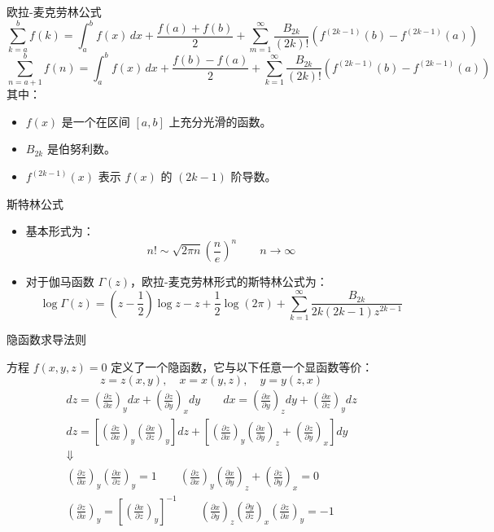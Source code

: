 \begin{defn}
    欧拉-麦克劳林公式
\[
\sum_{k=a}^{b} f(k) = \int_{a}^{b} f(x) \, dx + \frac{f(a) + f(b)}{2} 
+ \sum_{m=1}^{\infty} \frac{B_{2k}}{(2k)!} \left( f^{(2k-1)}(b) - f^{(2k-1)}(a) \right) 
\]
\[
\sum_{n=a+1}^{b} f(n) = \int_{a}^{b} f(x) \, dx + \frac{f(b) - f(a)}{2} 
+ \sum_{k=1}^{\infty} \frac{B_{2k}}{(2k)!} \left( f^{(2k-1)}(b) - f^{(2k-1)}(a) \right)
\]
其中：
\begin{itemize}
    \item \( f(x) \) 是一个在区间 \([a, b]\) 上充分光滑的函数。
    \item \( B_{2k} \) 是伯努利数。
    \item \( f^{(2k-1)}(x) \) 表示 \( f(x) \) 的 \( (2k-1) \) 阶导数。
\end{itemize}
\end{defn}
\begin{defn}
    斯特林公式
\begin{itemize}
    \item 基本形式为：
\[
n! \sim \sqrt{2\pi n} \left( \frac{n}{e} \right)^n \qquad n \to \infty
\]
\item 对于伽马函数 \( \Gamma(z) \)，欧拉-麦克劳林形式的斯特林公式为：
\[
\log \Gamma(z) = \left( z - \frac{1}{2} \right) \log z - z + \frac{1}{2} \log(2\pi) 
+ \sum_{k=1}^{\infty} \frac{B_{2k}}{2k(2k-1)z^{2k-1}}
\]
\end{itemize}
\end{defn}
\begin{defn}
隐函数求导法则

方程 \( f(x, y, z) = 0 \) 定义了一个隐函数，它与以下任意一个显函数等价：
    \[z = z(x, y), \quad x = x(y, z), \quad y = y(z, x)\]
\begin{gather*}
    dz = \left( \frac{\partial z}{\partial x} \right)_y dx + \left( \frac{\partial z}{\partial y} \right)_x dy
    \qquad
    dx = \left( \frac{\partial x}{\partial y} \right)_z dy + \left( \frac{\partial x}{\partial z} \right)_y dz
    \\
    dz = \left[ \left( \frac{\partial z}{\partial x} \right)_y \left( \frac{\partial x}{\partial z} \right)_y \right] dz 
    + \left[ \left( \frac{\partial z}{\partial x} \right)_y \left( \frac{\partial x}{\partial y} \right)_z 
    + \left( \frac{\partial z}{\partial y} \right)_x \right] dy
    \\\Downarrow\\
    \left( \frac{\partial z}{\partial x} \right)_y \left( \frac{\partial x}{\partial z} \right)_y = 1
    \qquad
    \left( \frac{\partial z}{\partial x} \right)_y \left( \frac{\partial x}{\partial y} \right)_z + \left( \frac{\partial z}{\partial y} \right)_x = 0
    \\
    \left( \frac{\partial z}{\partial x} \right)_y = \left[ \left( \frac{\partial x}{\partial z} \right)_y \right]^{-1}
    \qquad
    \left( \frac{\partial x}{\partial y} \right)_z \left( \frac{\partial y}{\partial z} \right)_x \left( \frac{\partial z}{\partial x} \right)_y = -1
\end{gather*}
\end{defn}
